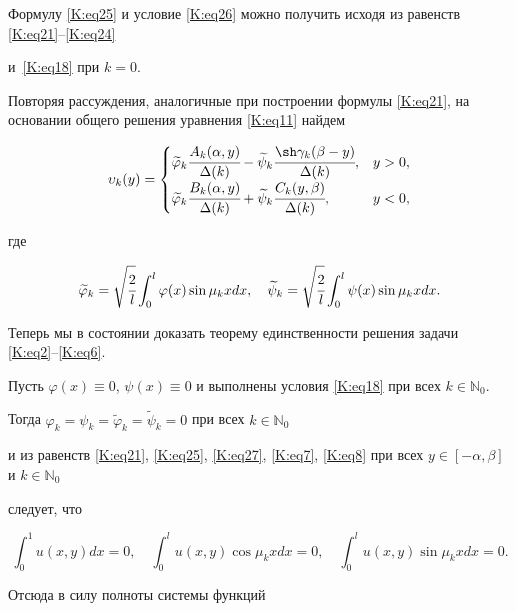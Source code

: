 Формулу \eqref{K:eq25} и условие \eqref{K:eq26} можно получить исходя из равенств \eqref{K:eq21}--\eqref{K:eq24}

и~\eqref{K:eq18} при $k=0$.



Повторяя рассуждения, аналогичные при построении формулы \eqref{K:eq21}, на основании общего решения уравнения \eqref{K:eq11} найдем

\begin{equation}

\label{K:eq27}

\upsilon_k(y)=\begin{cases}

\widetilde{\varphi}_k \cfrac{A_k (\alpha,y)}{\Delta (k)} - \widetilde{\psi}_k \cfrac{\sh \gamma_k (\beta - y)}{\Delta(k)},  &y>0,\\[2mm]

\widetilde{\varphi}_k \cfrac{B_k (\alpha,y)}{\Delta (k)} + \widetilde{\psi}_k \cfrac{C_k (y,\beta)}{\Delta(k)}, &y<0,

\end{cases}

\end{equation}

где

$$

\widetilde{\varphi}_k =\sqrt{\cfrac 2 l} \int _0^l \varphi(x) \sin \mu_k x dx, \quad \widetilde{\psi}_k = \sqrt{\cfrac 2 l} \int _0^l \psi(x) \sin \mu_k x dx.

$$



Теперь мы в состоянии доказать теорему единственности решения задачи  \eqref{K:eq2}--\eqref{K:eq6}. 

Пусть $\varphi(x)\equiv 0$, $\psi(x) \equiv 0$ и выполнены условия \eqref{K:eq18} при всех $k \in \mathbb{N}_{0}$. 

Тогда $\varphi_k=\psi_k=\widetilde{\varphi}_k=\widetilde{\psi}_k=0$ при всех $k \in \mathbb{N}_{0}$

и из равенств \eqref{K:eq21}, \eqref{K:eq25}, \eqref{K:eq27}, \eqref{K:eq7}, \eqref{K:eq8} при всех $y\in[-\alpha,\beta]$ и $k \in \mathbb{N}_{0}$

следует, что

$$

\int _0^1 u(x,y)dx=0, \quad \int_0^l u(x,y)\cos \mu_k x dx=0, \quad \int _0^l u(x,y) \sin \mu_k x dx=0.

$$

Отсюда в силу полноты системы функций 

